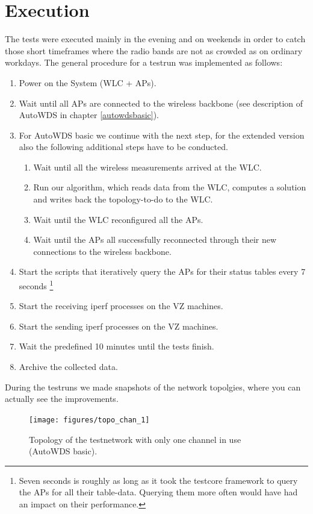   \section{Execution}
    The tests were executed mainly in the evening and on weekends in order to catch those short timeframes where the radio bands are not as crowded as on ordinary workdays.
    The general procedure for a testrun was implemented as follows:
    \begin{enumerate}
      \item Power on the System (\ac{WLC} + APs).
      \item Wait until all APs are connected to the wireless backbone (see description of AutoWDS in chapter \ref{autowdsbasic}).
      \item For AutoWDS basic we continue with the next step, for the extended version also the following additional steps have to be conducted.
	\begin{enumerate}
	 \item Wait until all the wireless measurements arrived at the \ac{WLC}.
	 \item Run our algorithm, which reads data from the \ac{WLC}, computes a solution and writes back the topology-to-do to the \ac{WLC}.
	 \item Wait until the \ac{WLC} reconfigured all the APs.
	 \item Wait until the APs all successfully reconnected through their new connections to the wireless backbone.
	\end{enumerate}
      \item Start the scripts that iteratively query the APs for their status tables every 7 seconds \footnote{Seven seconds is roughly as long as it took the testcore
      framework to query the APs for all their table-data. Querying them more often would have had an impact on their performance.}
      \item Start the receiving iperf processes on the VZ machines.
      \item Start the sending iperf processes on the VZ machines.
      \item Wait the predefined 10 minutes until the tests finish.
      \item Archive the collected data.
    \end{enumerate}
    
\newpage

    During the testruns we made snapshots of the network topolgies, where you can actually see the improvements.    
    \begin{figure}[h!]
      \centering
	\texttt{[image: figures/topo\_chan\_1]}
	\caption{Topology of the testnetwork with only one channel in use (AutoWDS basic).\protect\footnotemark }
      \label{fig:topo_chan_1}
    \end{figure}
    
